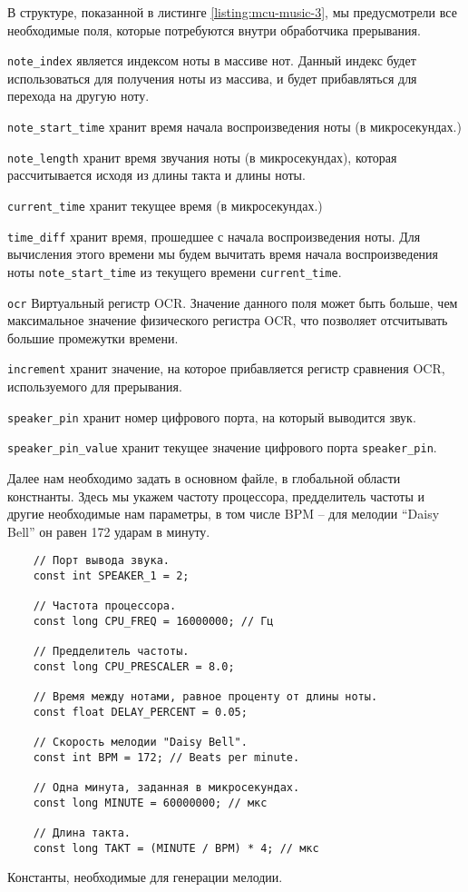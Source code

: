 \documentclass[../sparc.tex]{subfiles}
\begin{document}
В структуре, показанной в листинге \ref{listing:mcu-music-3}, мы предусмотрели
все необходимые поля, которые потребуются внутри обработчика прерывания.

\texttt{note_index} является индексом ноты в массиве нот.  Данный
индекс будет использоваться для получения ноты из массива, и будет прибавляться
для перехода на другую ноту.

\texttt{note_start_time} хранит время начала воспроизведения ноты (в
микросекундах.)

\texttt{note_length} хранит время звучания ноты (в микросекундах),
которая рассчитывается исходя из длины такта и длины ноты.

\texttt{current_time} хранит текущее время (в микросекундах.)

\texttt{time_diff} хранит время, прошедшее с начала воспроизведения
ноты.  Для вычисления этого времени мы будем вычитать время начала
воспроизведения ноты \texttt{note_start_time} из текущего времени
\texttt{current_time}.

\texttt{ocr} Виртуальный регистр OCR.  Значение данного поля может быть
больше, чем максимальное значение физического регистра OCR, что позволяет
отсчитывать большие промежутки времени.

\texttt{increment} хранит значение, на которое прибавляется регистр
сравнения OCR, используемого для прерывания.

\texttt{speaker_pin} хранит номер цифрового порта, на который выводится
звук.

\texttt{speaker_pin_value} хранит текущее значение цифрового порта
\texttt{speaker_pin}.

Далее нам необходимо задать в основном файле, в глобальной области констнанты.
Здесь мы укажем частоту процессора, предделитель частоты и другие необходимые
нам параметры, в том числе \gls{BPM} -- для мелодии ``Daisy Bell'' он равен 172
ударам в минуту.

\begin{listing}[H]
  \begin{verbatim}
    // Порт вывода звука.
    const int SPEAKER_1 = 2;

    // Частота процессора.
    const long CPU_FREQ = 16000000; // Гц

    // Предделитель частоты.
    const long CPU_PRESCALER = 8.0;

    // Время между нотами, равное проценту от длины ноты.
    const float DELAY_PERCENT = 0.05;

    // Скорость мелодии "Daisy Bell".
    const int BPM = 172; // Beats per minute.

    // Одна минута, заданная в микросекундах.
    const long MINUTE = 60000000; // мкс

    // Длина такта.
    const long TAKT = (MINUTE / BPM) * 4; // мкс
  \end{verbatim}
  \caption{Константы, необходимые для генерации мелодии.}
  \label{listing:mcu-music-4}
\end{listing}
\end{document}
